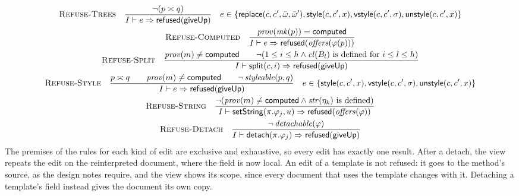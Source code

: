 \documentclass[11pt]{article}
\numberwithin{equation}{section}
\newcommand{\kw}[1]{\ensuremath{\mathsf{#1}}}
\newcommand{\rulelabel}[1]{\textsc{#1}}
\begin{document}
\begin{gather}
\rulelabel{Refuse-Trees}\quad
\frac{\neg(p \asymp q)}
     {I \vdash e \Rightarrow \kw{refused}(\kw{giveUp})}
  \quad e \in \{\kw{replace}(c, c', \bar\omega, \bar\omega'),
    \kw{style}(c, c', x), \kw{vstyle}(c, c', \sigma),
    \kw{unstyle}(c, c', x)\}
\\
\rulelabel{Refuse-Computed}\quad
\frac{\mathit{prov}(\mathit{mk}(p)) = \kw{computed}}
     {I \vdash e \Rightarrow \kw{refused}(\mathit{offers}(\varphi(p)))}
\\
\rulelabel{Refuse-Split}\quad
\frac{\mathit{prov}(m) \neq \kw{computed} \qquad
      \neg(1 \le i \le h \wedge \mathit{cl}(B_l) \text{ is defined for } i
        \le l \le h)}
     {I \vdash \kw{split}(c, i) \Rightarrow \kw{refused}(\kw{giveUp})}
\\
\rulelabel{Refuse-Style}\quad
\frac{p \asymp q \qquad \mathit{prov}(m) \neq \kw{computed} \qquad
      \neg\,\mathit{styleable}(p, q)}
     {I \vdash e \Rightarrow \kw{refused}(\kw{giveUp})}
  \quad e \in \{\kw{style}(c, c', x), \kw{vstyle}(c, c', \sigma),
    \kw{unstyle}(c, c', x)\}
\\
\rulelabel{Refuse-String}\quad
\frac{\neg(\mathit{prov}(m) \neq \kw{computed} \wedge
        \mathit{str}(\eta_k) \text{ is defined})}
     {I \vdash \kw{setString}(\pi.\varphi_j, u) \Rightarrow
      \kw{refused}(\mathit{offers}(\varphi))}
\\
\rulelabel{Refuse-Detach}\quad
\frac{\neg\,\mathit{detachable}(\varphi)}
     {I \vdash \kw{detach}(\pi.\varphi_j) \Rightarrow
      \kw{refused}(\kw{giveUp})}
\end{gather}
The premises of the rules for each kind of edit are exclusive and
exhaustive, so every edit has exactly one result.  After a detach, the
view repeats the edit on the reinterpreted document, where the field is now
local.  An edit of a template is not refused: it goes to the method's
source, as the design notes require, and the view shows its scope, since
every document that uses the template changes with it.  Detaching a
template's field instead gives the document its own copy.
\end{document}
